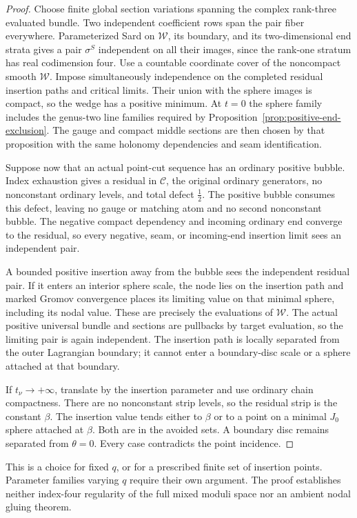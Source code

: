 \documentclass[11pt]{amsart}
\theoremstyle{definition}
\theoremstyle{remark}
\theoremstyle{plain}
\begin{document}
\begin{proof}
Choose finite global section variations spanning the
complex rank-three evaluated bundle. Two independent
coefficient rows span the pair fiber everywhere.
Parameterized Sard on $\mathcal W$, its boundary,
and its two-dimensional end strata gives a pair
$\sigma^S$ independent on all their images, since
the rank-one stratum has real codimension four.
Use a countable coordinate cover of the noncompact
smooth $\mathcal W$. Impose simultaneously
independence on the completed residual insertion
paths and critical limits. Their union with the
sphere images is compact, so the wedge has a
positive minimum.
At $t=0$ the sphere family includes the genus-two
line families required by
Proposition~\ref{prop:positive-end-exclusion}.
The gauge and compact middle sections are then
chosen by that proposition with the same holonomy
dependencies and seam identification.

Suppose now that an actual point-cut sequence
has an ordinary positive bubble.
Index exhaustion gives a residual in $\mathcal C$,
the original ordinary generators, no nonconstant
ordinary levels, and total defect $\frac12$.
The positive bubble consumes this defect, leaving
no gauge or matching atom and no second
nonconstant bubble. The negative compact
dependency and incoming ordinary end converge
to the residual, so every negative, seam, or
incoming-end insertion limit sees an independent
pair.

A bounded positive insertion away from the bubble
sees the independent residual pair. If it enters
an interior sphere scale, the node lies on the
insertion path and marked Gromov convergence
places its limiting value on that minimal
sphere, including its nodal value. These are
precisely the evaluations of $\mathcal W$.
The actual positive universal bundle and sections
are pullbacks by target evaluation, so the
limiting pair is again independent.
The insertion path is locally separated from
the outer Lagrangian boundary; it cannot enter
a boundary-disc scale or a sphere attached
at that boundary.

If $t_\nu\to+\infty$, translate by the insertion
parameter and use ordinary chain compactness.
There are no nonconstant strip levels, so the
residual strip is the constant $\beta$.
The insertion value tends either to $\beta$
or to a point on a minimal $J_0$ sphere
attached at $\beta$. Both are in the avoided
sets. A boundary disc remains separated from
$\theta=0$.
Every case contradicts the point incidence.
\end{proof}

This is a choice for fixed $q$, or for a prescribed
finite set of insertion points. Parameter families
varying $q$ require their own argument.
The proof establishes neither index-four
regularity of the full mixed moduli space nor
an ambient nodal gluing theorem.
\end{document}
